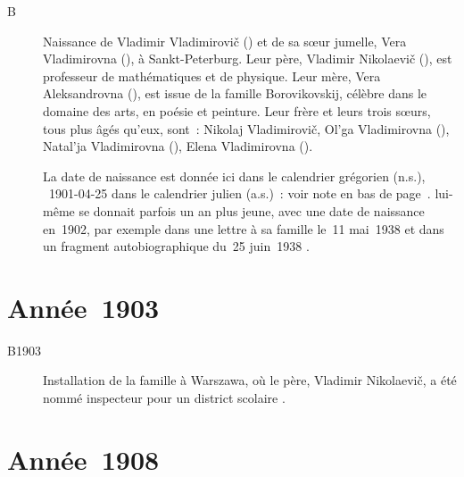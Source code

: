 \begin{description}
 \item[B]
 Naissance de Vladimir Vladimirovič \Sofronitsky{} () et
 de sa sœur jumelle, Vera Vladimirovna (), à
 Sankt-Peterburg.
 Leur père, Vladimir Nikolaevič (), est professeur de
 mathématiques et de physique.
 Leur mère, Vera Aleksandrovna (), est issue de la famille
 Borovikovskij, célèbre dans le domaine des arts, en poésie et peinture.
 Leur frère et leurs trois sœurs, tous plus âgés qu'eux, sont~:
 Nikolaj Vladimirovič,
 Ol'ga Vladimirovna (),
 Natal'ja Vladimirovna (),
 Elena Vladimirovna ().

 La date de naissance est donnée ici dans le calendrier grégorien (n.s.),
 \cad{}~1901-04-25 dans le calendrier julien (a.s.)~: voir note en bas de
 page~\pageref{fn:ASNS}.
 \VSofronitsky{} lui-même se donnait parfois un an plus jeune, avec une date
 de naissance en~1902, par exemple dans une lettre à sa famille le~11
 mai~1938 \citep[p.~23]{Kogan08} et dans un fragment autobiographique du~25
 juin~1938 \citep[p.~368]{Nikonovich08}.
\end{description}

\section{Année~1903}

\begin{description}
 \item[B1903]
 Installation de la famille \Sofronitsky{} à Warszawa, où le père, Vladimir
 Nikolaevič, a été nommé inspecteur pour un district scolaire
 \citep[voir][p.~84]{Artese}.
\end{description}

\section{Année~1908}

